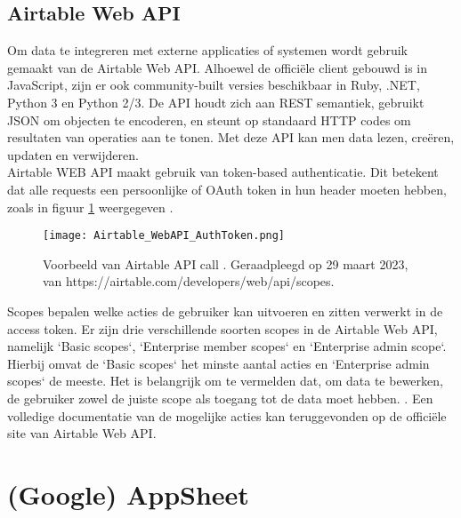 \subsection{Airtable Web API}


Om data te integreren met externe applicaties of systemen wordt gebruik gemaakt van de Airtable Web API. Alhoewel de officiële client gebouwd is in JavaScript, zijn er ook community-built versies beschikbaar in Ruby, .NET, Python 3 en Python 2/3. De API houdt zich aan REST semantiek, gebruikt JSON om objecten te encoderen, en steunt op standaard HTTP codes om resultaten van operaties aan te tonen. \autocite{AirtableAPI} Met deze API kan men data lezen, creëren, updaten en verwijderen. \\

Airtable WEB API maakt gebruik van token-based authenticatie. Dit betekent dat alle requests een persoonlijke of OAuth token in hun header moeten hebben, zoals in figuur \ref{fig:airtable_authtoken} weergegeven \autocite{AirtableAPIAuthentication}. \\

\begin{figure}
    \centering
    \texttt{[image: Airtable\_WebAPI\_AuthToken.png]}
    \caption{Voorbeeld van Airtable API call \autocite{AirtableAPIAuthentication}. Geraadpleegd op 29 maart 2023, van https://airtable.com/developers/web/api/scopes.}
    \label{fig:airtable_authtoken}
\end{figure}

Scopes bepalen welke acties de gebruiker kan uitvoeren en zitten verwerkt in de access token. Er zijn drie verschillende soorten scopes in de Airtable Web API, namelijk `Basic scopes`, `Enterprise member scopes` en `Enterprise admin scope`. Hierbij omvat de `Basic scopes` het minste aantal acties en `Enterprise admin scopes` de meeste. Het is belangrijk om te vermelden dat, om data te bewerken, de gebruiker zowel de juiste scope als toegang tot de data moet hebben. \autocite{AirtableAPIScopes}. Een volledige documentatie van de mogelijke acties kan teruggevonden op de officiële site van Airtable Web API. \\

\section{(Google) AppSheet}

